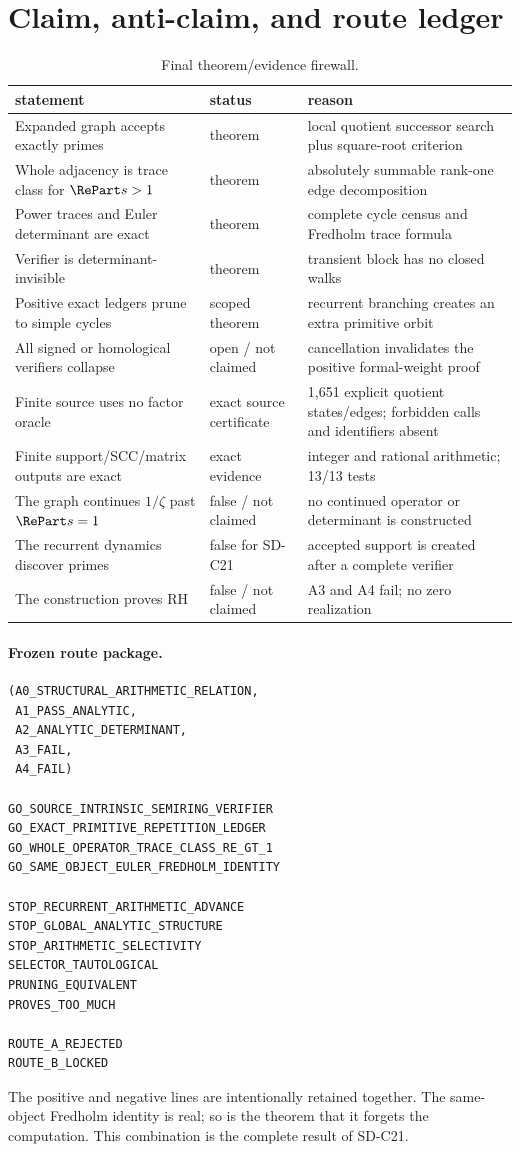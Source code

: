 \section{Claim, anti-claim, and route ledger}
\label{app:ledger}

\begin{table}[h]
\centering
\small
\caption{Final theorem/evidence firewall.}
\begin{tabularx}{\textwidth}{L{0.29\textwidth}L{0.19\textwidth}X}
\toprule
statement & status & reason \\
\midrule
Expanded graph accepts exactly primes & theorem & local quotient successor search plus square-root criterion \\
Whole adjacency is trace class for $\RePart s>1$ & theorem & absolutely summable rank-one edge decomposition \\
Power traces and Euler determinant are exact & theorem & complete cycle census and Fredholm trace formula \\
Verifier is determinant-invisible & theorem & transient block has no closed walks \\
Positive exact ledgers prune to simple cycles & scoped theorem & recurrent branching creates an extra primitive orbit \\
All signed or homological verifiers collapse & open / not claimed & cancellation invalidates the positive formal-weight proof \\
Finite source uses no factor oracle & exact source certificate & 1,651 explicit quotient states/edges; forbidden calls and identifiers absent \\
Finite support/SCC/matrix outputs are exact & exact evidence & integer and rational arithmetic; 13/13 tests \\
The graph continues $1/\zeta$ past $\RePart s=1$ & false / not claimed & no continued operator or determinant is constructed \\
The recurrent dynamics discover primes & false for SD-C21 & accepted support is created after a complete verifier \\
The construction proves RH & false / not claimed & A3 and A4 fail; no zero realization \\
\bottomrule
\end{tabularx}
\end{table}

\paragraph{Frozen route package.}
\begin{verbatim}
(A0_STRUCTURAL_ARITHMETIC_RELATION,
 A1_PASS_ANALYTIC,
 A2_ANALYTIC_DETERMINANT,
 A3_FAIL,
 A4_FAIL)

GO_SOURCE_INTRINSIC_SEMIRING_VERIFIER
GO_EXACT_PRIMITIVE_REPETITION_LEDGER
GO_WHOLE_OPERATOR_TRACE_CLASS_RE_GT_1
GO_SAME_OBJECT_EULER_FREDHOLM_IDENTITY

STOP_RECURRENT_ARITHMETIC_ADVANCE
STOP_GLOBAL_ANALYTIC_STRUCTURE
STOP_ARITHMETIC_SELECTIVITY
SELECTOR_TAUTOLOGICAL
PRUNING_EQUIVALENT
PROVES_TOO_MUCH

ROUTE_A_REJECTED
ROUTE_B_LOCKED
\end{verbatim}

The positive and negative lines are intentionally retained together.  The
same-object Fredholm identity is real; so is the theorem that it forgets the
computation.  This combination is the complete result of SD-C21.

